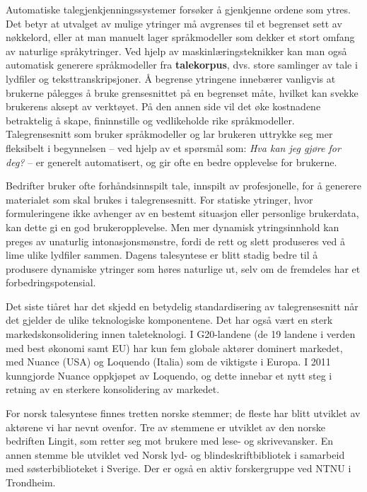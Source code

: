 \begin{multicols}{2}
Automatiske talegjenkjenningssystemer forsøker å gjenkjenne ordene som ytres. Det betyr at utvalget av mulige ytringer må avgrenses til et begrenset sett av nøkkelord, eller at man manuelt lager språkmodeller som dekker et stort omfang av naturlige språkytringer. Ved hjelp av maskinlæringsteknikker kan man også automatisk generere språkmodeller fra \textbf{talekorpus}, dvs. store samlinger av tale i lydfiler og teksttranskripsjoner. Å begrense ytringene innebærer vanligvis at brukerne pålegges å bruke grensesnittet på en begrenset måte, hvilket kan svekke brukerens aksept av verktøyet. På den annen side vil det øke kostnadene betraktelig å skape, fininnstille og vedlikeholde rike språkmodeller. Talegrensesnitt som bruker språkmodeller og lar brukeren uttrykke seg mer fleksibelt i begynnelsen – ved hjelp av et spørsmål som: \textit{Hva kan jeg gjøre for deg?} – er generelt automatisert, og gir ofte en bedre opplevelse for brukerne. 


Bedrifter bruker ofte forhåndsinnspilt tale, innspilt av  profesjonelle, for å generere materialet som skal brukes i talegrensesnitt. For statiske ytringer, hvor formuleringene ikke avhenger av en bestemt situasjon eller personlige brukerdata, kan dette gi en god brukeropplevelse. Men mer dynamisk ytringsinnhold kan preges av unaturlig intonasjonsmønstre, fordi de rett og slett produseres ved å lime ulike lydfiler sammen. Dagens talesyntese er blitt stadig bedre til å produsere dynamiske ytringer som høres naturlige ut, selv om de fremdeles har et forbedringspotensial. 

Det siste tiåret har det skjedd en betydelig standardisering av talegrensesnitt når det gjelder de ulike teknologiske komponentene. Det har  også vært en sterk markedskonsolidering innen taleteknologi. I G20-landene (de 19 landene i verden med best økonomi samt EU) har kun fem globale aktører dominert markedet, med Nuance (USA) og Loquendo (Italia) som de viktigste i Europa. I 2011 kunngjorde Nuance oppkjøpet av Loquendo, og dette innebar et nytt steg i retning av en sterkere konsolidering av markedet. 

For norsk talesyntese finnes tretten norske stemmer; de fleste har blitt utviklet av aktørene vi har nevnt ovenfor. 
Tre av stemmene er utviklet av den norske bedriften Lingit, som retter seg mot brukere med lese- og skrivevansker. 
En annen stemme ble utviklet ved Norsk lyd- og blindeskriftbibliotek i samarbeid med søsterbiblioteket i Sverige. 
Der er også en aktiv forskergruppe ved NTNU i Trondheim.


\end{multicols}
